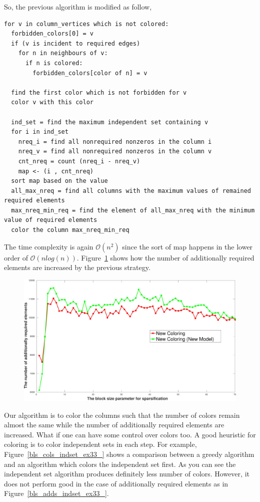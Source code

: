 \documentclass[12pt, oneside]{book}
\newcommand{\figref}[1]{Figure~\protect\ref{#1}}
\begin{document}
So, the previous algorithm is modified as follow,
\begin{lstlisting}
for v in column_vertices which is not colored:
  forbidden_colors[0] = v
  if (v is incident to required edges) 
    for n in neighbours of v:
      if n is colored:
        forbidden_colors[color of n] = v

  find the first color which is not forbidden for v
  color v with this color

  ind_set = find the maximum independent set containing v
  for i in ind_set
    nreq_i = find all nonrequired nonzeros in the column i
    nreq_v = find all nonrequired nonzeros in the column v
    cnt_nreq = count (nreq_i - nreq_v)
    map <- (i , cnt_nreq)
  sort map based on the value
  all_max_nreq = find all columns with the maximum values of remained required elements
  max_nreq_min_req = find the element of all_max_nreq with the minimum value of required elements
  color the column max_nreq_min_req
\end{lstlisting}
The time complexity is again $\mathcal{O}(n^2)$ since the sort of map happens in the lower order of 
$\mathcal{O}(nlog(n))$. 
\figref{bls_add_ex33_compare_max} shows how the number of additionally required elements are increased
by the previous strategy.
\begin{figure}
\centering
\includegraphics[width=0.9\linewidth]{bls_add_ex33_compare_max}
\label{bls_add_ex33_compare_max}
\end{figure}

Our algorithm is to color the columns such that the number of colors
remain almost the same while the number of additionally required elements are increased.
What if one can have some control over colors too. 
A good heuristic for coloring is to color independent sets in each step.
For example, \figref{bls_cols_indset_ex33_} shows a comparison between a greedy algorithm and
an algorithm which colors the independent set first. As you can see the independent set algorithm
produces definitely less number of colors. However, it does not perform good in the case of additionally
required elements as in \figref{bls_adds_indset_ex33_}.
\end{document}
